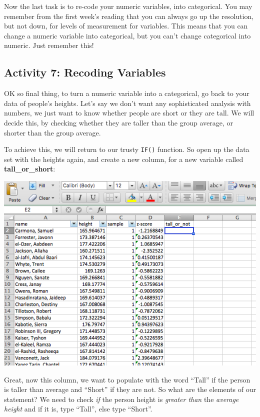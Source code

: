 \documentclass[]{book}
\theoremstyle{definition}
\theoremstyle{definition}
\theoremstyle{definition}
\theoremstyle{remark}
\begin{document}
Now the last task is to re-code your numeric variables, into
categorical. You may remember from the first week's reading that you can
always go up the resolution, but not down, for levels of measurement for
variables. This means that you can change a numeric variable into
categorical, but you can't change categorical into numeric. Just
remember this!

\hypertarget{activity-7-recoding-variables}{%
\subsection{Activity 7: Recoding
Variables}\label{activity-7-recoding-variables}}

 OK so final thing, to turn a numeric variable into a categorical, go
back to your data of people's heights. Let's say we don't want any
sophisticated analysis with numbers, we just want to know whether people
are short or they are tall. We will decide this, by checking whether
they are taller than the group average, or shorter than the group
average.

To achieve this, we will return to our trusty \texttt{IF()} function. So
open up the data set with the heights again, and create a new column,
for a new variable called \textbf{tall\_or\_short}:

\includegraphics{imgs/tall_or_not_col.png}

Great, now this column, we want to populate with the word ``Tall'' if
the person is taller than average and ``Short'' if they are not. So what
are the elements of our statement? We need to check \emph{if} the person
height is \emph{greater than} the \emph{average height} and if it is,
type ``Tall'', else type ``Short''.
\end{document}

